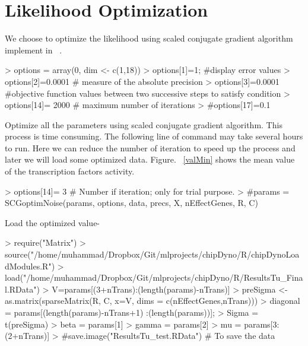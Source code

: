 \documentclass{article}
\begin{document}
\section{Likelihood Optimization}
We choose to optimize the likelihood using scaled conjugate gradient algorithm implement in  ~\cite{nabney:01}. 

\begin{Schunk}
\begin{Sinput}
> options = array(0, dim <- c(1,18))
> options[1]=1; #display error values
> options[2]=0.0001 # measure of the absolute precision
> options[3]=0.0001  #objective function values between two successive steps to satisfy condition
> options[14]= 2000  # maximum number of iterations
> #options[17]=0.1 
\end{Sinput}
\end{Schunk}

Optimize all the parameters using scaled conjugate gradient algorithm. This process is time consuming. The following line of command may take several hours to run. Here we can reduce the number of iteration to speed up the process and later we will load some optimized data. Figure. ~\ref{valMin} shows the mean value of the transcription factors activity.

\begin{Schunk}
\begin{Sinput}
> options[14]= 3 # Number if iteration; only for trial purpose.
> #params = SCGoptimNoise(params, options, data, precs, X, nEffectGenes, R, C)
\end{Sinput}
\end{Schunk}

Load the optimized value-
\begin{Schunk}
\begin{Sinput}
> require("Matrix")
> source("/home/muhammad/Dropbox/Git/mlprojects/chipDyno/R/chipDynoLoadModules.R")
> load("/home/muhammad/Dropbox/Git/mlprojects/chipDyno/R/ResultsTu_Final.RData")
> V=params[(3+nTrans):(length(params)-nTrans)]
> preSigma <- as.matrix(sparseMatrix(R, C, x=V, dims = c(nEffectGenes,nTrans)))
> diagonal = params[(length(params)-nTrans+1) :(length(params))];
> Sigma = t(preSigma)%
> beta = params[1]
> gamma = params[2]
> mu = params[3:(2+nTrans)]
> #save.image("ResultsTu_test.RData") # To save the data 
\end{Sinput}
\end{Schunk}
\end{document}
